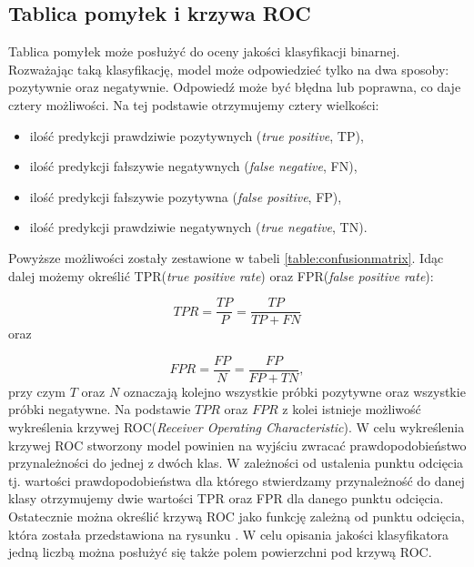 \subsection{Tablica pomyłek i krzywa ROC}
Tablica pomyłek może posłużyć do oceny jakości klasyfikacji binarnej. Rozważając taką klasyfikację, model może odpowiedzieć tylko na dwa sposoby: pozytywnie oraz negatywnie. Odpowiedź może być błędna lub poprawna, co daje cztery możliwości. Na tej podstawie otrzymujemy cztery wielkości:
\begin{itemize}
\item ilość predykcji prawdziwie pozytywnych (\textit{true positive}, TP),
\item ilość predykcji fałszywie negatywnych (\textit{false negative}, FN),
\item ilość predykcji fałszywie pozytywna (\textit{false positive}, FP),
\item ilość predykcji prawdziwie negatywnych (\textit{true negative}, TN).
\end{itemize}
Powyższe możliwości zostały zestawione w tabeli \ref{table:confusionmatrix}. Idąc dalej możemy określić TPR(\textit{true positive rate}) oraz FPR(\textit{false positive rate}):

\begin{equation}
TPR = \frac{TP}{P} = \frac{TP}{TP+FN} 
\end{equation}
\noindent
oraz

\begin{equation}
FPR = \frac{FP}{N} = \frac{FP}{FP+TN},
\end{equation}
przy czym $T$ oraz $N$ oznaczają kolejno wszystkie próbki pozytywne oraz wszystkie próbki negatywne. Na podstawie $TPR$ oraz $FPR$ z kolei istnieje możliwość wykreślenia krzywej ROC(\textit{Receiver Operating Characteristic}). W celu wykreślenia krzywej ROC stworzony model powinien na wyjściu zwracać prawdopodobieństwo  przynależności do jednej z dwóch klas. W zależności od ustalenia punktu odcięcia tj. wartości prawdopodobieństwa dla którego stwierdzamy przynależność do danej klasy otrzymujemy dwie wartości TPR oraz FPR dla danego punktu odcięcia. Ostatecznie można określić krzywą ROC jako funkcję zależną od punktu odcięcia, która została przedstawiona na rysunku \label{roc}. W celu opisania jakości klasyfikatora jedną liczbą można posłużyć się także polem powierzchni pod krzywą ROC.

